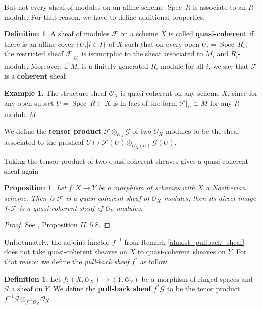 \documentclass{article}
\theoremstyle{plain}
\newtheorem{proposition}[theorem]{Proposition}
\theoremstyle{definition}
\newtheorem{definition}[theorem]{Definition}
\newtheorem{example}[theorem]{Example}
\DeclareMathOperator{\Spec}{Spec}
\begin{document}
\noindent But not every sheaf of modules on an affine scheme $\Spec\: R$ is associate to an $R$-module. For that reason, we have to define additional properties.


\begin{definition}
    A sheaf of modules $\mathcal{F}$ on a scheme $X$ is called \textbf{quasi-coherent} if there is an affine cover $\{ U_i |i\in I\}$ of $X$ such that on every open $U_i=\Spec\:R_i$, the restricted sheaf $\mathcal{F}\vert_{U_i}$ is isomorphic to the sheaf associated to $M_i$ and $R_i$-module.
    Moreover, if $M_i$ is a finitely generated $R_i$-module for all $i$, we say that $\mathcal{F}$ is a $\textbf{coherent}$ sheaf
\end{definition}

\begin{example}
    The structure sheaf $\mathcal{O}_X$ is quasi-coherent on any scheme $X$, since for any open subset $U=\Spec\:R\subset X$ is in fact of the form $\mathcal{F}\vert_U \cong \widetilde{M}$ for any $R$-module $M$
\end{example}


\noindent We define the \textbf{tensor product} $\mathcal{F}\otimes_{\mathcal{O}_X}\mathcal{G}$ of two $\mathcal{O}_X$-modules to be the sheaf associated to the presheaf $U\mapsto \mathcal{F}(U) \otimes_{\mathcal{O}_X(U)} \mathcal{G}(U)$.

Taking the tensor product of two quasi-coherent sheaves gives a quasi-coherent sheaf again


\begin{proposition}
    Let $f:X\rightarrow Y$ be a morphism of schemes with $X$ a Noetherian scheme.
    Then is $\mathcal{F}$ is a quasi-coherent sheaf of $\mathcal{O}_X$-modules, then its direct image $f_*\mathcal{F}$ is a quasi-coherent sheaf of $\mathcal{O}_Y$-modules.
\end{proposition}
\begin{proof}
    See \cite{Hartshorne}, Proposition $II.\:5.8$.
\end{proof}


\noindent Unfortunately, the adjoint functor $f^{-1}$ from Remark \ref{almost_pullback_sheaf} does not take quasi-coherent sheaves on $X$ to quasi-coherent sheaves on $Y$.
For that reason we define the \textit{pull-back sheaf} $f^*$ as follow
\begin{definition}
    Let $f:(X,\mathcal{O}_X)\rightarrow (Y,\mathcal{O}_Y)$ be a morphism of ringed spaces and $\mathcal{G}$ a sheaf on $Y$. 
    We define the \textbf{pull-back sheaf} $f^*\mathcal{G}$ to be the tenor product $f^{-1}\mathcal{G}\otimes_{f^{-1}\mathcal{O}_Y} \mathcal{O}_X$
\end{definition}
\end{document}
